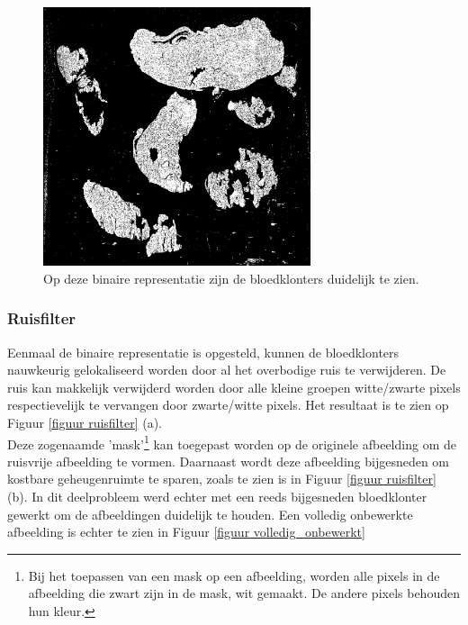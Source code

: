\documentclass[a4paper,kulak]{kulakarticle}
\begin{document}
\begin{figure}[H]
	\centering
	\includegraphics[width=0.7\textwidth]{grijswaarden_bin_vb}
	\caption{Op deze binaire representatie zijn de bloedklonters duidelijk te zien.}
	\label{figuur foto_bin}
\end{figure}

\subsubsection{Ruisfilter}
Eenmaal de binaire representatie is opgesteld, kunnen de bloedklonters nauwkeurig gelokaliseerd worden door al het overbodige ruis te verwijderen. De ruis kan makkelijk verwijderd worden door alle kleine groepen witte/zwarte pixels respectievelijk te vervangen door zwarte/witte pixels. Het resultaat is te zien op Figuur \ref{figuur ruisfilter} (a). \\
Deze zogenaamde 'mask'\footnote{Bij het toepassen van een mask op een afbeelding, worden alle pixels in de afbeelding die zwart zijn in de mask, wit gemaakt. De andere pixels behouden hun kleur.} kan toegepast worden op de originele afbeelding om de ruisvrije afbeelding te vormen. Daarnaast wordt deze afbeelding bijgesneden om kostbare geheugenruimte te sparen, zoals te zien is in Figuur \ref{figuur ruisfilter} (b). In dit deelprobleem werd echter met een reeds bijgesneden bloedklonter gewerkt om de afbeeldingen duidelijk te houden. Een volledig onbewerkte afbeelding is echter te zien in Figuur \ref{figuur volledig_onbewerkt}
\end{document}

